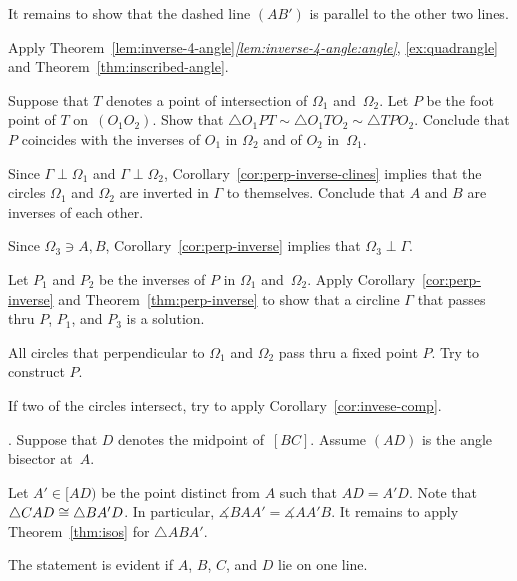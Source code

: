It remains to show that the dashed line $(AB')$ is parallel to the other two lines.

Apply Theorem~\ref{lem:inverse-4-angle}\textit{\ref{lem:inverse-4-angle:angle}}, 
\ref{ex:quadrangle}
and Theorem~\ref{thm:inscribed-angle}.

Suppose that $T$ denotes a point of intersection of $\Omega_1$ and~$\Omega_2$.
Let $P$ be the foot point of $T$ on~$(O_1O_2)$.
Show that
$\triangle O_1PT
\sim \triangle O_1TO_2
\sim \triangle TPO_2$.
Conclude that $P$ coincides with the inverses of $O_1$ in $\Omega_2$ and of $O_2$ in~$\Omega_1$.

Since $\Gamma\perp\Omega_1$ and $\Gamma\perp\Omega_2$,
Corollary~\ref{cor:perp-inverse-clines} 
implies that
the circles $\Omega_1$ and $\Omega_2$ are inverted in $\Gamma$ 
to themselves.
Conclude that $A$ and $B$ are inverses of each other.

Since $\Omega_3\ni A,B$,
Corollary~\ref{cor:perp-inverse} implies that
$\Omega_3\perp \Gamma$.

Let $P_1$ and $P_2$ be the inverses of $P$ 
in $\Omega_1$ and~$\Omega_2$.
Apply Corollary~\ref{cor:perp-inverse} and Theorem~\ref{thm:perp-inverse}
to show that a circline $\Gamma$ that passes thru $P$, $P_1$, and $P_3$ is a solution.

All circles that perpendicular to $\Omega_1$ and $\Omega_2$ pass thru a fixed point $P$.
Try to construct $P$.

If two of the circles intersect, try to apply Corollary~\ref{cor:invese-comp}.

\setcounter{eqtn}{0}

\parbf{\ref{ex:abs-bisect=median}}.
Suppose that $D$ denotes the midpoint of~$[BC]$.
Assume $(AD)$ is the angle bisector at~$A$.

Let $A'\in [AD)$ be the point distinct from $A$ such that $AD=A'D$.
Note that $\triangle CAD\z\cong\triangle BA'D$.
In particular, $\measuredangle BAA'=\measuredangle AA'B$.
It remains to apply Theorem~\ref{thm:isos} for $\triangle ABA'$.

The statement is evident if $A$, $B$, $C$, and $D$ lie on one line.

